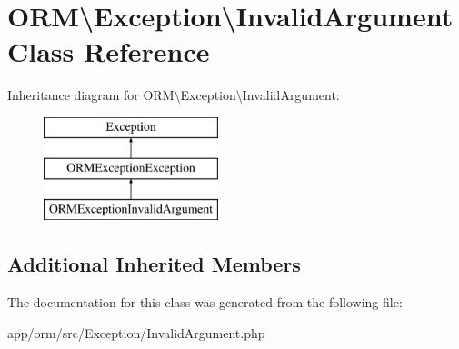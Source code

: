 \hypertarget{classORM_1_1Exception_1_1InvalidArgument}{}\section{O\+RM\textbackslash{}Exception\textbackslash{}Invalid\+Argument Class Reference}
\label{classORM_1_1Exception_1_1InvalidArgument}
Inheritance diagram for O\+RM\textbackslash{}Exception\textbackslash{}Invalid\+Argument\+:\begin{figure}[H]
\begin{center}
\leavevmode
\includegraphics[height=3.000000cm]{classORM_1_1Exception_1_1InvalidArgument}
\end{center}
\end{figure}
\subsection*{Additional Inherited Members}


The documentation for this class was generated from the following file\+:\begin{DoxyCompactItemize}
\item 
app/orm/src/\+Exception/Invalid\+Argument.\+php\end{DoxyCompactItemize}
